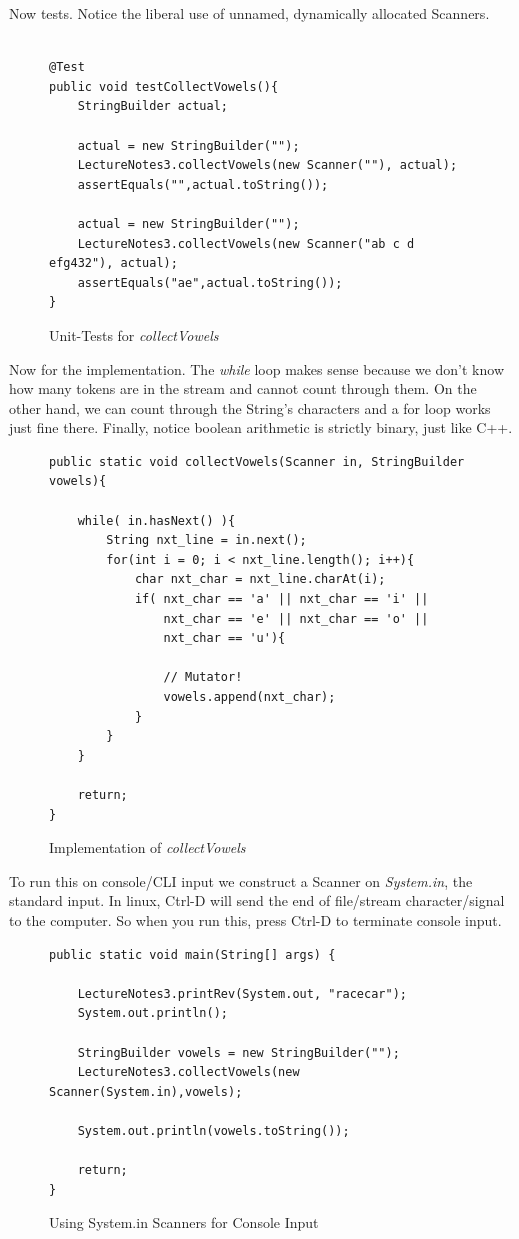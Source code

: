 \documentclass[]{tufte-handout}
\begin{document}
Now tests. Notice the liberal use of unnamed, dynamically allocated Scanners.

\begin{figure}
\begin{lstlisting}

@Test
public void testCollectVowels(){
	StringBuilder actual;

	actual = new StringBuilder("");
	LectureNotes3.collectVowels(new Scanner(""), actual);
	assertEquals("",actual.toString());

	actual = new StringBuilder("");
	LectureNotes3.collectVowels(new Scanner("ab c d efg432"), actual);
	assertEquals("ae",actual.toString());
}

\end{lstlisting}
\label{fig:vowelstests}
\caption{Unit-Tests for \textit{collectVowels}}
\end{figure}

Now for the implementation. The \textit{while} loop makes sense because we don't know how many tokens are in the stream and cannot count through them. On the other hand, we can count through the String's characters and a for loop works just fine there. Finally, notice boolean arithmetic is strictly binary, just like C++.

\begin{figure}
\begin{lstlisting}
public static void collectVowels(Scanner in, StringBuilder vowels){

	while( in.hasNext() ){
		String nxt_line = in.next();
		for(int i = 0; i < nxt_line.length(); i++){
			char nxt_char = nxt_line.charAt(i);
			if( nxt_char == 'a' || nxt_char == 'i' ||
				nxt_char == 'e' || nxt_char == 'o' ||
				nxt_char == 'u'){

				// Mutator!
				vowels.append(nxt_char);
			}
		}
	}

	return;
}
\end{lstlisting}
\label{fig:vowelsimpl}
\caption{Implementation of \textit{collectVowels}}
\end{figure}

To run this on console/CLI input we construct a Scanner on \textit{System.in}, the standard input. In linux, Ctrl-D will send the end of file/stream character/signal to the computer. So when you run this, press Ctrl-D to terminate console input.

\begin{figure}
\begin{lstlisting}
public static void main(String[] args) {

	LectureNotes3.printRev(System.out, "racecar");
	System.out.println();

	StringBuilder vowels = new StringBuilder("");
	LectureNotes3.collectVowels(new Scanner(System.in),vowels);

	System.out.println(vowels.toString());

	return;
}
\end{lstlisting}

\label{fig:cliInput}
\caption{Using System.in Scanners for Console Input}
\end{figure}
\end{document}
